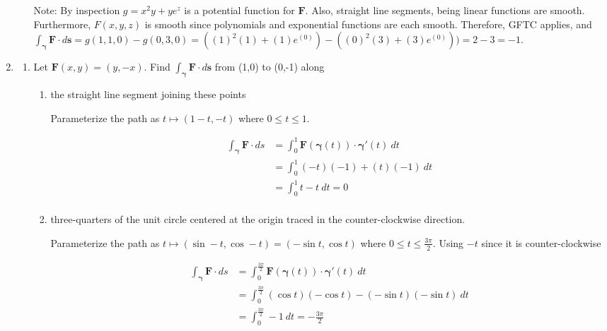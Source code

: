 \documentclass{article}
\newcommand{\gam}{\boldsymbol{\gamma}}
\begin{document}
\begin{enumerate}
\begin{enumerate}
{                        Note: By inspection $g = x^2y + ye^z$ is a potential function for $\boldsymbol{F}$. Also, straight line segments, being linear functions are smooth. Furthermore, $F(x,y,z)$ is smooth since polynomials and exponential functions are each smooth. Therefore, GFTC applies, and $\int_{\gam} \boldsymbol{F} \cdot d \boldsymbol{s} = g(1,1,0) - g(0,3,0) = ((1)^2(1)+(1)e^{(0)}) - ((0)^2(3)+(3)e^{(0)})) = 2 - 3 = -1$.
                }
        \end{enumerate}
    \newpage 
    \item 
        \begin{enumerate}
            \item Let $\boldsymbol{F}(x,y) = (y,-x)$. Find $\displaystyle \int_{\gam} \boldsymbol{F} \cdot d\boldsymbol{s}$ from (1,0) to (0,-1) along
                \begin{enumerate}[label=(\roman*)]
                    \item the straight line segment joining these points

                        Parameterize the path as $t \mapsto (1 - t, -t)$ where $0 \leq t \leq 1$.

                        \begin{align*}
                            \int_{\gam} \boldsymbol{F} \cdot ds &= \int_0^1 \boldsymbol{F}(\gam(t)) \cdot \gam'(t) \ dt \\
                            &= \int_0^1 (-t)(-1) + (t)(-1) \ dt \\
                            &= \int_0^1 t - t \ dt = 0\\
                        \end{align*}
                    \item three-quarters of the unit circle centered at the origin traced in the counter-clockwise direction.

                        Parameterize the path as $t \mapsto (\sin -t , \cos -t) = (-\sin t, \cos t)$ where $0 \leq t \leq \frac{3\pi}{2}$. Using $-t$ since it is counter-clockwise

                        \begin{align*}
                            \int_{\gam} \boldsymbol{F} \cdot ds &= \int^{\frac{3\pi}{2}}_0 \boldsymbol{F}(\gam(t)) \cdot \gam'(t) \ dt \\
                            &= \int^{\frac{3\pi}{2}}_0 (\cos t)(-\cos t) - (-\sin t)(-\sin t) \ dt \\
                            &= \int^{\frac{3\pi}{2}}_0 -1 \ dt = -\frac{3\pi}{2}\\
                        \end{align*}


\end{enumerate}
\end{enumerate}
\end{enumerate}
\end{document}
